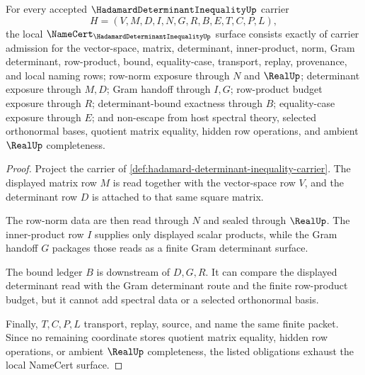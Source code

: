 \begin{theorem}
\label{thm:hadamard-determinant-inequality-namecert-obligations}
For every accepted $\HadamardDeterminantInequalityUp$ carrier
$$
H=(V,M,D,I,N,G,R,B,E,T,C,P,L),
$$
the local $\NameCert_{\HadamardDeterminantInequalityUp}$ surface consists
exactly of carrier admission for the vector-space, matrix, determinant,
inner-product, norm, Gram determinant, row-product, bound, equality-case,
transport, replay, provenance, and local naming rows; row-norm exposure through
$N$ and $\RealUp$; determinant exposure through $M,D$; Gram handoff through
$I,G$; row-product budget exposure through $R$; determinant-bound exactness
through $B$; equality-case exposure through $E$; and non-escape from host
spectral theory, selected orthonormal bases, quotient matrix equality, hidden
row operations, and ambient $\RealUp$ completeness.
\end{theorem}
\begin{proof}
Project the carrier of
\autoref{def:hadamard-determinant-inequality-carrier}. The displayed matrix
row $M$ is read together with the vector-space row $V$, and the determinant
row $D$ is attached to that same square matrix.

The row-norm data are then read through $N$ and sealed through $\RealUp$. The
inner-product row $I$ supplies only displayed scalar products, while the Gram
handoff $G$ packages those reads as a finite Gram determinant surface.

The bound ledger $B$ is downstream of $D,G,R$. It can compare the displayed
determinant read with the Gram determinant route and the finite row-product
budget, but it cannot add spectral data or a selected orthonormal basis.

Finally, $T,C,P,L$ transport, replay, source, and name the same finite packet.
Since no remaining coordinate stores quotient matrix equality, hidden row
operations, or ambient $\RealUp$ completeness, the listed obligations exhaust
the local NameCert surface.
\end{proof}

